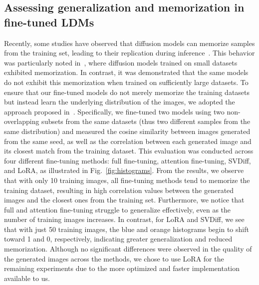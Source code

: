 \subsection{Assessing generalization and memorization in fine-tuned LDMs}
Recently, some studies have observed that diffusion models can memorize samples from the training set, leading to their replication during inference~\cite{somepalli,carlini}. This behavior was particularly noted in~\cite{kadkhodaie}, where diffusion models trained on small datasets exhibited memorization. In contrast, it was demonstrated that the same models do not exhibit this memorization when trained on sufficiently large datasets. To ensure that our fine-tuned models do not merely memorize the training datasets but instead learn the underlying distribution of the images, we adopted the approach proposed in~\cite{kadkhodaie}. Specifically, we fine-tuned two models using two non-overlapping subsets from the same datasets (thus two different samples from the same distribution) and measured the cosine similarity between images generated from the same seed, as well as the correlation between each generated image and its closest match from the training dataset. This evaluation was conducted across four different fine-tuning methods: full fine-tuning, attention fine-tuning, SVDiff, and LoRA, as illustrated in Fig.~\ref{fig:histograms}. From the results, we observe that with only 10 training images, all fine-tuning methods tend to memorize the training dataset, resulting in high correlation values between the generated images and the closest ones from the training set. Furthermore, we notice that full and attention fine-tuning struggle to generalize effectively, even as the number of training images increases. In contrast, for LoRA and SVDiff, we see that with just 50 training images, the blue and orange histograms begin to shift toward 1 and 0, respectively, indicating greater generalization and reduced memorization. Although no significant differences were observed in the quality of the generated images across the methods, we chose to use LoRA for the remaining experiments due to the more optimized and faster implementation available to us.


